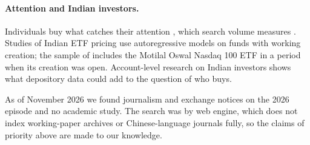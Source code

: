 \documentclass[11pt,a4paper]{article}
\theoremstyle{definition}
\begin{document}
\paragraph{Attention and Indian investors.} Individuals buy what catches their attention \citep{barber2008all}, which search volume measures \citep{da2011search}. Studies of Indian ETF pricing use autoregressive models on funds with working creation; the sample of \citet{reddy2020pricing} includes the Motilal Oswal Nasdaq 100 ETF in a period when its creation was open. Account-level research on Indian investors \citep{campbell2019rich} shows what depository data could add to the question of who buys.

As of November 2026 we found journalism and exchange notices on the 2026 episode and no academic study. The search was by web engine, which does not index working-paper archives or Chinese-language journals fully, so the claims of priority above are made to our knowledge.





\end{document}
